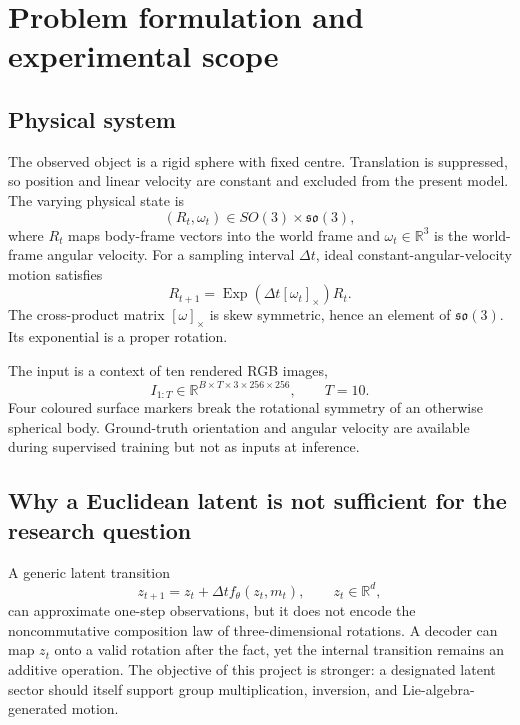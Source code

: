 \documentclass[11pt,a4paper]{article}
\newcommand{\R}{\mathbb R}\newcommand{\SO}{\mathrm{SO}}\newcommand{\so}{\mathfrak{so}}\newcommand{\Exp}{\operatorname{Exp}}\newcommand{\sg}{\operatorname{sg}}\newcommand{\vct}[1]{\bm{#1}}
\begin{document}
\section{Problem formulation and experimental scope}
\subsection{Physical system}
The observed object is a rigid sphere with fixed centre. Translation is suppressed, so position and linear velocity are constant and excluded from the present model. The varying physical state is
\begin{equation}
(R_t,\omega_t)\in SO(3)\times\so(3),
\end{equation}
where $R_t$ maps body-frame vectors into the world frame and $\omega_t\in\R^3$ is the world-frame angular velocity. For a sampling interval $\Delta t$, ideal constant-angular-velocity motion satisfies
\begin{equation}
R_{t+1}=\Exp(\Delta t[\omega_t]_\times)R_t.
\end{equation}
The cross-product matrix $[\omega]_\times$ is skew symmetric, hence an element of $\so(3)$. Its exponential is a proper rotation.

The input is a context of ten rendered RGB images,
\begin{equation}
I_{1:T}\in\R^{B\times T\times3\times256\times256},\qquad T=10.
\end{equation}
Four coloured surface markers break the rotational symmetry of an otherwise spherical body. Ground-truth orientation and angular velocity are available during supervised training but not as inputs at inference.

\subsection{Why a Euclidean latent is not sufficient for the research question}
A generic latent transition
\begin{equation}
z_{t+1}=z_t+\Delta t f_\theta(z_t,m_t),\qquad z_t\in\R^d,
\end{equation}
can approximate one-step observations, but it does not encode the noncommutative composition law of three-dimensional rotations. A decoder can map $z_t$ onto a valid rotation after the fact, yet the internal transition remains an additive operation. The objective of this project is stronger: a designated latent sector should itself support group multiplication, inversion, and Lie-algebra-generated motion.
\end{document}

